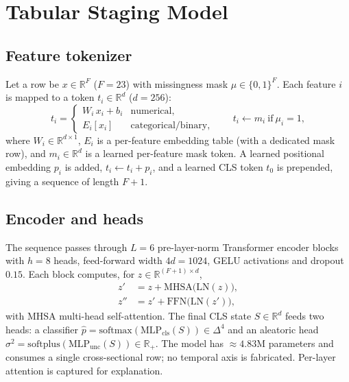 \documentclass[10pt,twocolumn]{article}
\begin{document}
\section{Tabular Staging Model}
\label{sec:tabular}

\subsection{Feature tokenizer}
Let a row be $x\in\mathbb{R}^{F}$ ($F{=}23$) with missingness mask $\mu\in\{0,1\}^F$.
Each feature $i$ is mapped to a token $t_i\in\mathbb{R}^{d}$ ($d{=}256$):
\begin{equation}
t_i =
\begin{cases}
W_i\,x_i + b_i & \text{numerical},\\
E_i[x_i] & \text{categorical/binary},
\end{cases}
\qquad
t_i \leftarrow m_i \ \text{if}\ \mu_i{=}1,
\end{equation}
where $W_i\in\mathbb{R}^{d\times1}$, $E_i$ is a per-feature embedding table (with a
dedicated mask row), and $m_i\in\mathbb{R}^d$ is a learned per-feature mask token.
A learned positional embedding $p_i$ is added, $t_i\leftarrow t_i+p_i$, and a learned
CLS token $t_0$ is prepended, giving a sequence of length $F{+}1$.

\subsection{Encoder and heads}
The sequence passes through $L{=}6$ pre-layer-norm Transformer encoder blocks with
$h{=}8$ heads, feed-forward width $4d{=}1024$, GELU activations and dropout
$0.15$. Each block computes, for $z\in\mathbb{R}^{(F+1)\times d}$,
\begin{align}
z' &= z + \mathrm{MHSA}\!\big(\mathrm{LN}(z)\big),\\
z'' &= z' + \mathrm{FFN}\!\big(\mathrm{LN}(z')\big),
\end{align}
with $\mathrm{MHSA}$ multi-head self-attention. The final CLS state
$S\in\mathbb{R}^{d}$ feeds two heads: a classifier
$\hat{p}=\mathrm{softmax}(\mathrm{MLP}_{\text{cls}}(S))\in\Delta^{4}$ and an
aleatoric head $\sigma^2=\mathrm{softplus}(\mathrm{MLP}_{\text{unc}}(S))\in
\mathbb{R}_{+}$. The model has $\approx4.83$M parameters and consumes a single
cross-sectional row; no temporal axis is fabricated. Per-layer attention is captured
for explanation.
\end{document}
